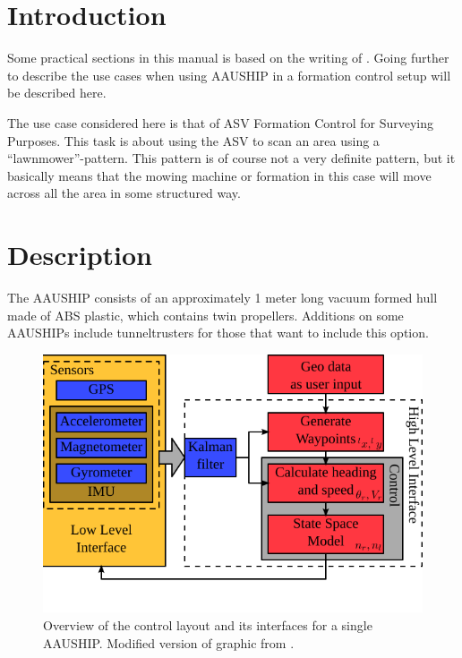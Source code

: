 \section{Introduction}

Some practical sections in this manual is based on the writing of
\cite{12gr730}. Going further to describe the use cases when using
AAUSHIP in a formation control setup will be described here.

The use case considered here is that of \ac{ASV} Formation Control for
Surveying Purposes. This task is about using the \ac{ASV} to scan an
area using a ``lawnmower''-pattern. This pattern is of course not a
very definite pattern, but it basically means that the mowing machine
or formation in this case will move across all the area in some structured way.

\section{Description} The AAUSHIP consists of an approximately 1 meter
long vacuum formed hull made of ABS plastic, which contains twin
propellers. Additions on some AAUSHIPs include tunneltrusters for
those that want to include this option.

\begin{figure}[htbp]
	\includegraphics[width=\textwidth]{fig/vessel-block-overview}
	\caption{Overview of the control layout and its interfaces for a
		single AAUSHIP.
		Modified version of graphic from \citep{12gr730}.}
	\label{fig:vessel-block-overview}
\end{figure}
